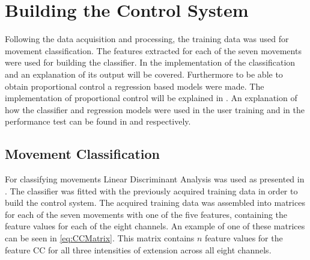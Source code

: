 \section{Building the Control System}

Following the data acquisition and processing, the training data was used for movement classification. The features extracted for each of the seven movements were used for building the classifier. In  the implementation of the classification and an explanation of its output will be covered. Furthermore to be able to obtain proportional control a regression based models were made. The implementation of proportional control will be explained in . An explanation of how the classifier and regression models were used in the user training and in the performance test can be found in  and  respectively.  


\subsection{Movement Classification} \label{sub:M:classification}

For classifying movements Linear Discriminant Analysis was used as presented in . The classifier was fitted with the previously acquired training data in order to build the control system.  
The acquired training data was assembled into matrices for each of the seven movements with one of the five features, containing the feature values for each of the eight channels. An example of one of these matrices can be seen in \eqref{eq:CCMatrix}. This matrix contains $n$ feature values for the feature CC for all three intensities of extension across all eight channels.  


